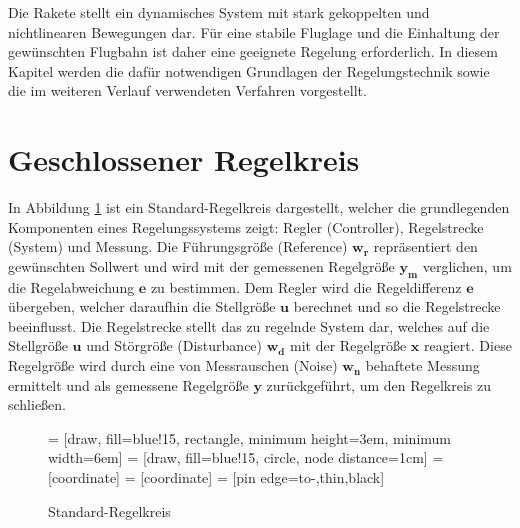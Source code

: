 Die Rakete stellt ein dynamisches System mit stark gekoppelten und nichtlinearen Bewegungen dar. Für eine stabile Fluglage und die Einhaltung der gewünschten Flugbahn ist daher eine geeignete Regelung erforderlich. In diesem Kapitel werden die dafür notwendigen Grundlagen der Regelungstechnik sowie die im weiteren Verlauf verwendeten Verfahren vorgestellt. 
\section{Geschlossener Regelkreis}
\label{sec:regelkreis}
In Abbildung \ref{fig:standard_regelkreis} ist ein Standard-Regelkreis dargestellt, welcher die grundlegenden Komponenten eines Regelungssystems zeigt: Regler (Controller), Regelstrecke (System) und Messung. Die Führungsgröße (Reference) $\mathbf{w_r}$ repräsentiert den gewünschten Sollwert und wird mit der gemessenen Regelgröße $\mathbf{y_m}$ verglichen, um die Regelabweichung $\mathbf{e}$ zu bestimmen. Dem Regler wird die Regeldifferenz $\mathbf{e}$ übergeben, welcher daraufhin die Stellgröße $\mathbf{u}$ berechnet und so die Regelstrecke beeinflusst. Die Regelstrecke stellt das zu regelnde System dar, welches auf die Stellgröße $\mathbf{u}$ und Störgröße (Disturbance) $\mathbf{w_d}$ mit der Regelgröße $\mathbf{x}$ reagiert. Diese Regelgröße wird durch eine von Messrauschen (Noise) $\mathbf{w_n}$ behaftete Messung ermittelt und als gemessene Regelgröße $\mathbf{y}$ zurückgeführt, um den Regelkreis zu schließen.
\begin{figure}[H]
    \centering
{} = [draw, fill=blue!15, rectangle, 
    minimum height=3em, minimum width=6em]
 = [draw, fill=blue!15, circle, node distance=1cm]
 = [coordinate]
 = [coordinate]
 = [pin edge={to-,thin,black}]

    \caption{Standard-Regelkreis }
    \label{fig:standard_regelkreis}
\end{figure}


